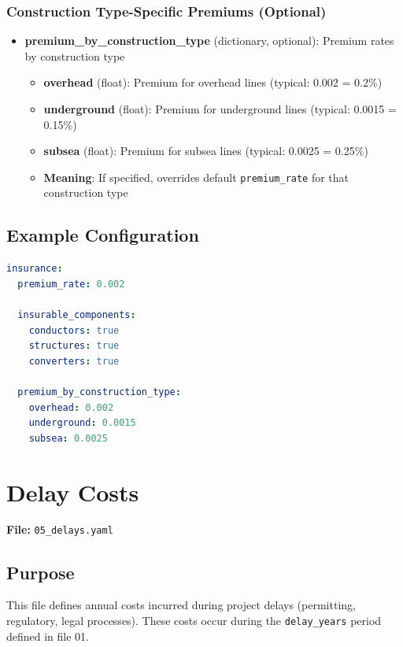 \documentclass[ctcc_full_documentation.tex]{subfiles}
\begin{document}
\subsubsection{Construction Type-Specific Premiums (Optional)}

\begin{itemize}
    \item \textbf{premium\_by\_construction\_type} (dictionary, optional): Premium rates by construction type
    \begin{itemize}
        \item \textbf{overhead} (float): Premium for overhead lines (typical: 0.002 = 0.2\%)
        \item \textbf{underground} (float): Premium for underground lines (typical: 0.0015 = 0.15\%)
        \item \textbf{subsea} (float): Premium for subsea lines (typical: 0.0025 = 0.25\%)
        \item \textbf{Meaning}: If specified, overrides default \texttt{premium\_rate} for that construction type
    \end{itemize}
\end{itemize}

\subsection{Example Configuration}

\begin{lstlisting}[language=yaml]
insurance:
  premium_rate: 0.002

  insurable_components:
    conductors: true
    structures: true
    converters: true

  premium_by_construction_type:
    overhead: 0.002
    underground: 0.0015
    subsea: 0.0025
\end{lstlisting}

\section{Delay Costs}
\label{sec:delays}

\textbf{File:} \texttt{05\_delays.yaml}

\subsection{Purpose}

This file defines annual costs incurred during project delays (permitting, regulatory, legal processes). These costs occur during the \texttt{delay\_years} period defined in file 01.
\end{document}
